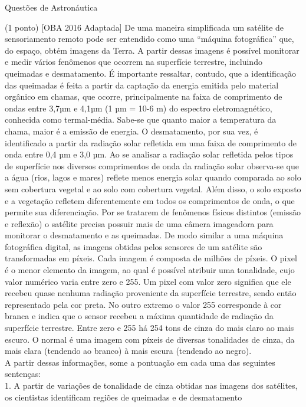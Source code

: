 \documentclass{../lista}
\begin{document}
\begin{secao}{Questões de Astronáutica}
		\begin{questao}{(1 ponto) [OBA 2016 Adaptada]}
			De uma maneira simplificada um satélite de sensoriamento remoto pode ser entendido como uma “máquina fotográfica” que, do espaço, obtém imagens da Terra. A partir dessas imagens é possível monitorar e medir vários fenômenos que ocorrem na superfície terrestre, incluindo queimadas e desmatamento. É importante ressaltar, contudo, que a identificação das queimadas é feita a partir da captação da energia emitida pelo material orgânico em chamas, que ocorre, principalmente na faixa de comprimento de ondas entre 3,7µm e 4,1µm (1 µm = 10-6 m) do espectro eletromagnético, conhecida como termal-média. Sabe-se que quanto maior a temperatura da chama, maior é a emissão de energia. O desmatamento, por sua vez, é identificado a partir da radiação solar refletida em uma faixa de comprimento de onda entre 0,4 µm e 3,0 µm. Ao se analisar a radiação solar refletida pelos tipos de superfície nos diversos comprimentos de onda da radiação solar observa-se que a água (rios, lagos e mares) reflete menos energia solar quando comparada ao solo sem cobertura vegetal e ao solo com cobertura vegetal. Além disso, o solo exposto e a vegetação refletem diferentemente em todos os comprimentos de onda, o que permite sua diferenciação. Por se tratarem de fenômenos físicos distintos (emissão e reflexão) o satélite precisa possuir mais de uma câmera imageadora para monitorar o desmatamento e as queimadas. De modo similar a uma máquina fotográfica digital, as imagens obtidas pelos sensores de um satélite são transformadas em píxeis. Cada imagem é composta de milhões de píxeis. O pixel é o menor elemento da imagem, ao qual é possível atribuir uma tonalidade, cujo valor numérico varia entre zero e 255. Um pixel com valor zero significa que ele recebeu quase nenhuma radiação proveniente da superfície terrestre, sendo então representado pela cor preta. No outro extremo o valor 255 corresponde à cor branca e indica que o sensor recebeu a máxima quantidade de radiação da superfície terrestre. Entre zero e 255 há 254 tons de cinza do mais claro ao mais escuro. O normal é uma imagem com píxeis de diversas tonalidades de cinza, da mais clara (tendendo ao branco) à mais escura (tendendo ao negro). \\
			
			A partir dessas informações, some a pontuação em cada uma das seguintes sentenças: \\
			
			1. A partir de variações de tonalidade de cinza obtidas nas imagens dos satélites, os cientistas identificam regiões de queimadas e de desmatamento
			

\end{questao}
\end{secao}
\end{document}
